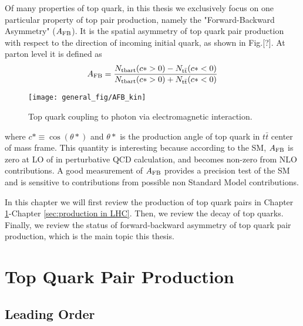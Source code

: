 Of many properties of top quark, in this thesis we exclusively focus on one particular property of top pair production, namely the "Forward-Backward Asymmetry" ($A_{\mathrm{FB}}$). It is the spatial asymmetry of top quark pair production with respect to the direction of incoming initial quark, as shown in Fig.[?]. At parton level it is defined as 
\begin{equation}
A_{\mathrm{FB}} = \frac{N_{\mathrm{t bar t}}(c*>0)-N_{\mathrm{t\bar t}}(c*<0)}{N_{\mathrm{t bar t}}(c*>0)+N_{\mathrm{t\bar t}}(c*<0)}
\end{equation}

\begin{figure}[hbt]
  \begin{center}
    \texttt{[image: general\_fig/AFB\_kin]}
  \caption{\small Top quark coupling to photon via electromagnetic interaction.}
    \label{fig:ttgamma}
  \end{center}
\end{figure}

where $c*\equiv \cos(\theta*)$ and $\theta*$ is the production angle of top quark in $t\bar t$ center of mass frame. This quantity is interesting because according to the SM, $A_{\mathrm{FB}}$ is zero at LO of in perturbative QCD calculation, and becomes non-zero from NLO contributions. A good measurement of $A_{\mathrm{FB}}$ provides a precision test of the SM and is sensitive to contributions from possible non Standard Model contributions. 

In this chapter we will first review the production of top quark pairs in Chapter \ref{sec:Production}-Chapter \ref{sec:production in LHC}. Then, we review the decay of top quarks. Finally, we review the status of forward-backward asymmetry of top quark pair production, which is the main topic this thesis. 

\section{Top Quark Pair Production}
\label{sec:Production}

\subsection{Leading Order}


